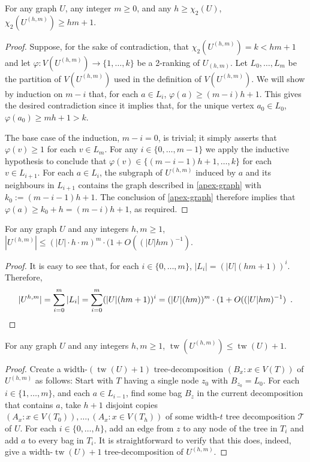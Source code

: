\documentclass[kpfonts]{patmorin}
\DeclareMathOperator{\tw}{tw}
\newcommand{\trn}{\chi_2}
\theoremstyle{named}
\begin{document}
\begin{lem}\label{boost}
    For any graph $U$, any integer $m\ge 0$, and any $h\ge\trn(U)$, $\trn(U^{(h,m)})\ge hm +1$.
\end{lem}

\begin{proof}
    Suppose, for the sake of contradiction, that $\trn(U^{(h,m)})=k<hm+1$ and let $\varphi:V(U^{(h,m)})\to\{1,\ldots,k\}$ be a 2-ranking of $U_{(h,m)}$.  Let $L_0,\ldots,L_{m}$ be the partition of $V(U^{(h,m)})$ used in the definition of $V(U^{(h,m)})$.
    We will show by induction on $m-i$ that, for each $a\in L_{i}$, $\varphi(a)\ge(m-i)h+1$. This gives the desired contradiction since it implies that, for the unique vertex $a_0\in L_0$, $\varphi(a_0)\ge m h+1 > k$.

    The base case of the induction, $m-i=0$, is trivial; it simply asserts that $\varphi(v)\ge 1$ for each $v\in L_m$.  For any $i\in\{0,\ldots,m-1\}$ we apply the inductive hypothesis to conclude that $\varphi(v)\in\{(m-i-1)h+1,\ldots,k\}$ for each $v\in L_{i+1}$.  For each $a\in L_i$, the subgraph of $U^{(h,m)}$ induced by $a$ and its neighbours in $L_{i+1}$ contains the graph described in \cref{apex-graph} with $k_0:=(m-i-1)h+1$.  The conclusion of \cref{apex-graph} therefore implies that $\varphi(a)\ge k_0+h=(m-i)h+1$, as required.
\end{proof}

\begin{lem}\label{boost-size}
    For any graph $U$ and any integers $h,m \ge 1$, $|U^{(h,m)}| \le (|U|\cdot h\cdot m)^{m}\cdot (1+O((|U|hm)^{-1})$.
\end{lem}

\begin{proof}
    It is easy to see that, for each $i\in \{0,\ldots,m\}$, $|L_i|=(|U|(hm+1))^i$.  Therefore,
    \[ |U^{h,m}| = \sum_{i=0}^m |L_i| = \sum_{i=0}^m (|U|(hm+1))^i = (|U|(hm))^{m}\cdot (1+O((|U|hm)^{-1}) \enspace . \qedhere
    \]
\end{proof}


\begin{lem}\label{boost-treewidth}
    For any graph $U$ and any integers $h,m\ge 1$, $\tw(U^{(h,m)})\le \tw(U)+1$.
\end{lem}

\begin{proof}
  Create a width-$(\tw(U)+1)$ tree-decomposition $(B_x:x\in V(T))$ of $U^{(h,m)}$ as follows: Start with $T$ having a single node $z_0$ with $B_{z_0}=L_0$.  For each $i\in\{1,\ldots,m\}$, and each $a\in L_{i-1}$, find some bag $B_z$ in the current decomposition that contains $a$, take $h+1$ disjoint copies $(A_x:x\in V(T_0)),\ldots,(A_x:x\in V(T_h))$ of some width-$t$ tree decomposition $\mathcal{T}$ of $U$.  For each $i\in\{0,\ldots,h\}$, add an edge from $z$ to any node of the tree in $T_i$ and add $a$ to every bag in $T_i$.  It is straightforward to verify that this does, indeed, give a width-$\tw(U)+1$ tree-decomposition of $U^{(h,m)}$.
\end{proof}
\end{document}
